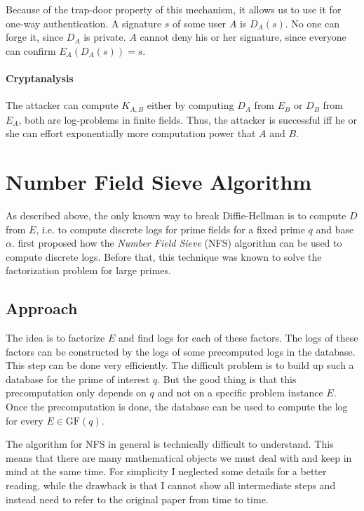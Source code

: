 \documentclass[paper=a4, fontsize=11pt]{scrartcl} %
\numberwithin{equation}{section} %
\numberwithin{figure}{section} %
\numberwithin{table}{section} %
\begin{document}
Because of the trap-door property of this mechanism, it allows us to use it for one-way authentication. A signature $s$ of some user $A$ is $D_A(s)$. No one can forge it, since $D_A$ is private. $A$ cannot deny his or her signature, since everyone can confirm $E_A(D_A(s)) = s$.

\paragraph{Cryptanalysis}
The attacker can compute $K_{A,B}$ either by computing $D_A$ from $E_B$ or $D_B$ from $E_A$, both are log-problems in finite fields. Thus, the attacker is successful iff he or she can effort exponentially more computation power that $A$ and $B$.

\section{Number Field Sieve Algorithm}
As described above, the only known way to break Diffie-Hellman is to compute $D$ from $E$, i.e. to compute discrete logs for prime fields for a fixed prime $q$ and base $\alpha$. \citep{gordon1993discrete} first proposed how the \textit{Number Field Sieve} (NFS) algorithm can be used to compute discrete logs. Before that, this technique was known to solve the factorization problem for large primes.

\subsection{Approach}
The idea is to factorize $E$ and find logs for each of these factors. The logs of these factors can be constructed by the logs of some precomputed logs in the database. This step can be done very efficiently. The difficult problem is to build up such a database for the prime of interest $q$. But the good thing is that this precomputation only depends on $q$ and not on a specific problem instance $E$. Once the precomputation is done, the database can be used to compute the log for every $E\in \mathrm{GF}(q)$.

The algorithm for NFS in general is technically difficult to understand. This means that there are many mathematical objects we must deal with and keep in mind at the same time. For simplicity I neglected some details for a better reading, while the drawback is that I cannot show all intermediate steps and instead need to refer to the original paper from time to time.
\end{document}
